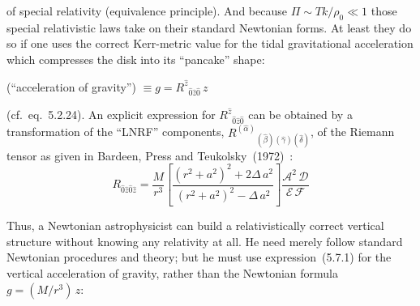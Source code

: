 


of special relativity (equivalence principle).  And because $\Pi \sim Tk/\rho_0 \ll 1$ those
special relativistic laws take on their standard Newtonian forms.  At least they
do so if one uses the correct Kerr-metric value for the tidal gravitational
acceleration which compresses the disk into its ``pancake'' shape:

(``acceleration of gravity'') $\equiv g = R^{\hat{z}}{}_{\hat{0}\hat{z}\hat{0}}\,z$
%
\begin{equation}
\tag{5.7.1}
\end{equation}

(cf.\ eq.~5.2.24).  An explicit expression for $R^{\hat{z}}{}_{\hat{0}\hat{z}\hat{0}}$
can be obtained by a transformation of the ``LNRF'' components,
$R^{(\hat{\alpha})}{}_{(\hat{\beta})(\hat{\gamma})(\hat{\delta})}$, of the Riemann tensor as
given in Bardeen, Press and Teukolsky~(1972)~\cite{BardeenPressTeukolsky1972}:
%
\begin{equation}
\tag{5.7.2}
R_{\hat{0}\hat{z}\hat{0}\hat{z}}
= \frac{M}{r^3}
  \left[
    \frac{(r^2 + a^2)^2 + 2\Delta\, a^2}{(r^2 + a^2)^2 - \Delta\, a^2}
  \right]
  \frac{\mathscr{A}^2\,\mathscr{D}}
       {\mathscr{E}\,\mathscr{F}}
\end{equation}

Thus, a Newtonian astrophysicist can build a relativistically correct vertical
structure without knowing any relativity at all.  He need merely follow standard
Newtonian procedures and theory; but he must use expression~(5.7.1) for the
vertical acceleration of gravity, rather than the Newtonian formula $g = (M/r^3)\,z$:

